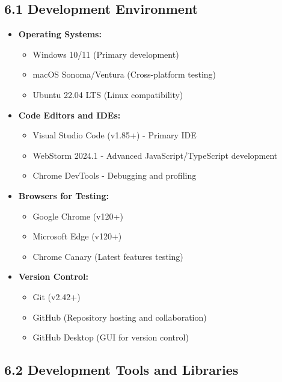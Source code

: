\documentclass[12pt,a4paper]{article}
\begin{document}
\subsection*{\textbf{6.1 Development Environment}}

\begin{itemize}
    \item \textbf{Operating Systems:}
    \begin{itemize}
        \item Windows 10/11 (Primary development)
        \item macOS Sonoma/Ventura (Cross-platform testing)
        \item Ubuntu 22.04 LTS (Linux compatibility)
    \end{itemize}
    
    \item \textbf{Code Editors and IDEs:}
    \begin{itemize}
        \item Visual Studio Code (v1.85+) - Primary IDE
        \item WebStorm 2024.1 - Advanced JavaScript/TypeScript development
        \item Chrome DevTools - Debugging and profiling
    \end{itemize}
    
    \item \textbf{Browsers for Testing:}
    \begin{itemize}
        \item Google Chrome (v120+)
        \item Microsoft Edge (v120+)
        \item Chrome Canary (Latest features testing)
    \end{itemize}
    
    \item \textbf{Version Control:}
    \begin{itemize}
        \item Git (v2.42+)
        \item GitHub (Repository hosting and collaboration)
        \item GitHub Desktop (GUI for version control)
    \end{itemize}
\end{itemize}

\subsection*{\textbf{6.2 Development Tools and Libraries}}
\end{document}
